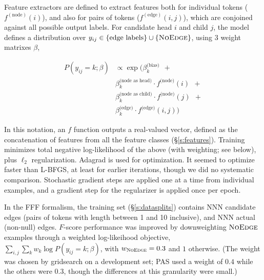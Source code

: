 \documentclass[11pt]{article}
\newcommand{\bocomment}[1]{\textcolor{Bittersweet}{[#1 -BTO]}}
\newcommand{\noedge}{\textsc{NoEdge}}
\begin{document}
Feature extractors are defined to extract features both for individual tokens ($f^{(\text{node})}(i)$), and also for pairs of tokens ($f^{(\text{edge})}(i,j)$), which are conjoined against all possible output labels.
For candidate head $i$ and child $j$, the model defines a distribution over
$y_{ij} \in \{\text{edge labels}\} \cup \{\noedge\}$, using $3$ weight matrixes
$\beta$,

\begin{align*} 
  P(y_{ij}=k; \beta) & \propto 
  \exp \big( \beta^{\text{(bias)}}_k \ \ + \\
  &
  \beta^{\text{(node as head)}}_k \cdot f^{\text{(node)}}(i)
  \ \ + \\ 
  &
  \beta^{\text{(node as child)}}_k \cdot f^{\text{(node)}}(j)
  \ \ + \\
  &
  \beta^{\text{(edge)}}_k \cdot f^{\text{(edge)}}(i,j)
    \big)
\end{align*}

\noindent
In this notation, an $f$ function outputs a real-valued vector, defined as the concatenation of features from all the feature classes (\S\ref{s:features}).
Training minimizes total negative log-likelihood of the above (with weighting; see below),
plus $\ell_2$ regularization.  Adagrad \cite{duchi_adaptive_2011} is used for optimization.
It seemed to optimize faster than L-BFGS, at least for earlier iterations, though we did no systematic comparison. Stochastic gradient steps are applied one at a time from individual examples, and a gradient step for the regularizer is applied once per epoch.

In the FFF formalism, the training set (\S\ref{s:datasplits})
contains NNN candidate edges (pairs of tokens with length between 1 and 10 inclusive),
and NNN actual (non-null) edges.  $F$-score performance was improved by
downweighting $\noedge$ examples through a weighted log-likeihood objective,
$\sum_{i,j} \sum_k w_k \log P(y_{ij}=k;\beta)$, with $w_{\noedge}=0.3$ and $1$ otherwise.  
(The weight was chosen by gridsearch on a development set; 
PAS used a weight of $0.4$ while the others were $0.3$, though the differences at this granularity were small.)


\end{document}
